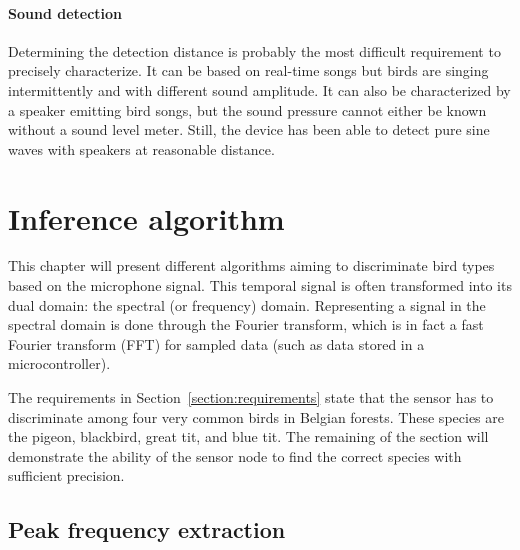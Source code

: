 \documentclass{EPL-master-thesis-covers-EN}
\begin{document}
\subsubsection*{Sound detection}

Determining the detection distance is probably the most difficult requirement to precisely characterize. It can be based on real-time songs but birds are singing intermittently and with different sound amplitude. It can also be characterized by a speaker emitting bird songs, but the sound pressure cannot either be known without a sound level meter. Still, the device has been able to detect pure sine waves with speakers at reasonable distance.

    
\chapter{Inference algorithm}

This chapter will present different algorithms aiming to discriminate bird types based on the microphone signal. This temporal signal is often transformed into its dual domain: the spectral (or frequency) domain. Representing a signal in the spectral domain is done through the Fourier transform, which is in fact a fast Fourier transform (FFT) for sampled data (such as data stored in a microcontroller).

The requirements in Section~\ref{section:requirements} state that the sensor has to discriminate among four very common birds in Belgian forests. These species are the pigeon, blackbird, great tit, and blue tit. The remaining of the section will demonstrate the ability of the sensor node to find the correct species with sufficient precision.

\section{Peak frequency extraction}
\end{document}
